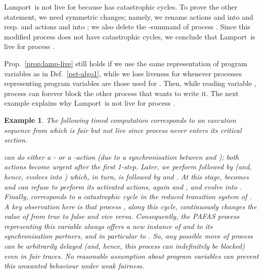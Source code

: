 \documentclass[copyright,creativecommons]{eptcs}
\newenvironment{proof}{\noindent {\bf Proof:}}{\bigskip}
\newenvironment{tracex}{\ccspace{0.15}\noindent}{\ccspace{0.2}}
\newcommand{\ccspace}[1]{\vspace{#1cm}}
\newtheorem{example}[theorem]{Example}
\newcommand{\lamporta}{{\sf Lamport}} \newcommand{\lamportb}{\lamporta}
\begin{document}
\begin{proof}
\lamporta\ is not live for  because  has
catastrophic cycles. To prove the other statement, we need symmetric
changes; namely, we rename actions  and  into  and 
resp. and actions  and  into ; we also delete the
-summand of process . Since this modified process does not
have catastrophic cycles, we conclude that \lamporta\ is live for process
.
\end{proof}

Prop.~\ref{prop:lamp-live} still holds if we use the same representation of
program variables as in Def.~\ref{pet-algo1}, while we lose liveness for
 whenever processes representing program variables are those used
for . Then, while reading variable , process 
can forever block the other process that wants to write it. The next
example explains why \lamporta\ is not live for process .
\begin{example}\rm\label{ex:lamp-1}
The following timed computation corresponds to an execution sequence from
 which is fair but not live since process  never
enters its critical section.

\begin{tracex}

\end{tracex} 

\noindent  can do either a - or a -action (due to
a synchronisation between  and ); both actions become
urgent after the first 1-step. Later, we perform   followed by
 (and, hence,  evolves into )
which, in turn, is followed by  and . At this stage,
 becomes  and  can refuse to perform its
activated actions, again  and , and evolve into
.  Finally,  corresponds to a catastrophic
cycle in the reduced transition system of .
A key observation here is that process , along this cycle,
continuously changes the value of  from {\em true} to {\em false} and
vice versa. Consequently, the PAFAS process representing this
variable always offers a new instance of  and  to its
synchronisation partners, and in particular to . So,
any possible move of process  can be arbitrarily delayed (and,
hence, this process can indefinitely be blocked) even in fair traces. No
reasonable assumption about program variables can prevent this unwanted
behaviour under weak fairness.
\end{example}

\vspace{-0.5cm}
\end{document}
